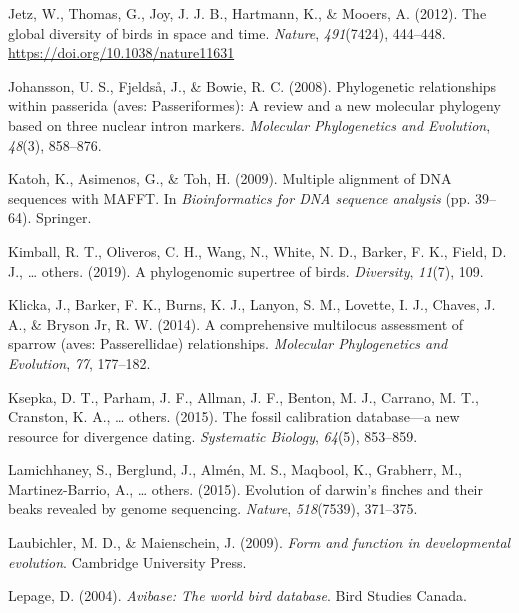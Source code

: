 \documentclass[
  english,
  man]{apa6}
\newlength{\cslhangindent}
\newlength{\cslentryspacingunit} %
\newenvironment{CSLReferences}[2] %
 {%
  \setlength{\parindent}{0pt}
  \ifodd #1
  \let\oldpar\par
  \def\par{\hangindent=\cslhangindent\oldpar}
  \fi
  \setlength{\parskip}{#2\cslentryspacingunit}
 }%
 {}
\begin{document}
\begin{CSLReferences}{1}{0}
\leavevmode{}%
Jetz, W., Thomas, G., Joy, J. J. B., Hartmann, K., \& Mooers, A. (2012). {The global diversity of birds in space and time}. \emph{Nature}, \emph{491}(7424), 444--448. \url{https://doi.org/10.1038/nature11631}

\leavevmode{}%
Johansson, U. S., Fjeldså, J., \& Bowie, R. C. (2008). Phylogenetic relationships within passerida (aves: Passeriformes): A review and a new molecular phylogeny based on three nuclear intron markers. \emph{Molecular Phylogenetics and Evolution}, \emph{48}(3), 858--876.

\leavevmode{}%
Katoh, K., Asimenos, G., \& Toh, H. (2009). Multiple alignment of DNA sequences with MAFFT. In \emph{Bioinformatics for DNA sequence analysis} (pp. 39--64). Springer.

\leavevmode{}%
Kimball, R. T., Oliveros, C. H., Wang, N., White, N. D., Barker, F. K., Field, D. J., \ldots{} others. (2019). A phylogenomic supertree of birds. \emph{Diversity}, \emph{11}(7), 109.

\leavevmode{}%
Klicka, J., Barker, F. K., Burns, K. J., Lanyon, S. M., Lovette, I. J., Chaves, J. A., \& Bryson Jr, R. W. (2014). A comprehensive multilocus assessment of sparrow (aves: Passerellidae) relationships. \emph{Molecular Phylogenetics and Evolution}, \emph{77}, 177--182.

\leavevmode{}%
Ksepka, D. T., Parham, J. F., Allman, J. F., Benton, M. J., Carrano, M. T., Cranston, K. A., \ldots{} others. (2015). The fossil calibration database---a new resource for divergence dating. \emph{Systematic Biology}, \emph{64}(5), 853--859.

\leavevmode{}%
Lamichhaney, S., Berglund, J., Almén, M. S., Maqbool, K., Grabherr, M., Martinez-Barrio, A., \ldots{} others. (2015). Evolution of darwin's finches and their beaks revealed by genome sequencing. \emph{Nature}, \emph{518}(7539), 371--375.

\leavevmode{}%
Laubichler, M. D., \& Maienschein, J. (2009). \emph{Form and function in developmental evolution}. Cambridge University Press.

\leavevmode{}%
Lepage, D. (2004). \emph{Avibase: The world bird database}. Bird Studies Canada.


\end{CSLReferences}
\end{document}
